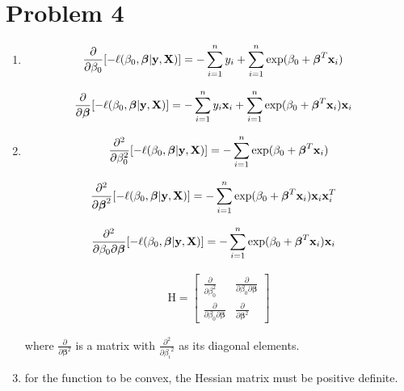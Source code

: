 \documentclass{article}
\newcommand{\vect}[1]{\boldsymbol{#1}}
\newcommand{\vectrm}[1]{\boldsymbol{\rm #1}}
\begin{document}
\section*{Problem 4}
\begin{enumerate}[label=(\alph*)]
\item 
\begin{align*}
\frac{\partial}{\partial \beta_0}[ -\ell(\beta_0, \vect{\beta}| \vectrm{y}, \vectrm{X}) ]&= -\sum_{i=1}^{n} y_i + \sum_{i=1}^{n}\exp(\beta_0 + \vect{\beta}^T \vectrm{x}_i) 
\end{align*}

\begin{align*}
\frac{\partial}{\partial \vect{\beta}}[ -\ell(\beta_0, \vect{\beta}| \vectrm{y}, \vectrm{X}) ]&= -\sum_{i=1}^{n} y_i \vectrm{x}_i + \sum_{i=1}^{n}\exp(\beta_0 + \vect{\beta}^T \vectrm{x}_i) \vectrm{x}_i
\end{align*}

\item
\begin{align*}
\frac{\partial^2}{\partial \beta_0^2}[ -\ell(\beta_0, \vect{\beta}| \vectrm{y}, \vectrm{X}) ]&= -\sum_{i=1}^{n}\exp(\beta_0 + \vect{\beta}^T \vectrm{x}_i) \\
\end{align*}

\begin{align*}
\frac{\partial^2}{\partial \vect{\beta}^2}[ -\ell(\beta_0, \vect{\beta}| \vectrm{y}, \vectrm{X}) ]&= -\sum_{i=1}^{n}\exp(\beta_0 + \vect{\beta}^T \vectrm{x}_i) \vectrm{x}_i \vectrm{x}_i^T
\end{align*}

\begin{align*}
\frac{\partial^2}{\partial \beta_0 \partial \vect{\beta}}[ -\ell(\beta_0, \vect{\beta}| \vectrm{y}, \vectrm{X}) ]&= -\sum_{i=1}^{n}\exp(\beta_0 + \vect{\beta}^T \vectrm{x}_i) \vectrm{x}_i
\end{align*}

\begin{align*}
\mathrm{H} = \begin{bmatrix}
    \frac{\partial}{\partial \beta_0^2} & \frac{\partial}{\partial \beta_0 \partial \vect{\beta}} \\
    \frac{\partial}{\partial \beta_0 \partial \vect{\beta}} & \frac{\partial}{\partial \vect{\beta}^2}
\end{bmatrix}
\end{align*}

where \(\frac{\partial}{\partial \vect{\beta}^2}\) is a matrix with \(\frac{\partial^2}{\partial {\beta_i}^2}\) as its diagonal elements.

\item for the function to be convex, the Hessian matrix must be positive definite.
\end{enumerate}
\end{document}
